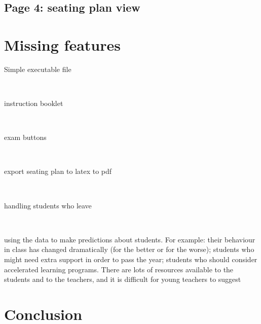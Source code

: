 \documentclass[10pt]{article}
\begin{document}
\subsection{Page 4: seating plan view}


\section{Missing features} \label{notdone}

Simple executable file

\

instruction booklet

\

exam buttons

\

export seating plan to latex to pdf

\

handling students who leave

\

using the data to make predictions about students. For example: their behaviour in class has changed dramatically (for the better or for the worse); students who might need extra support in order to pass the year; students who should consider accelerated learning programs. There are lots of resources available to the students and to the teachers, and it is difficult for young teachers to suggest



\section{Conclusion}
\end{document}
